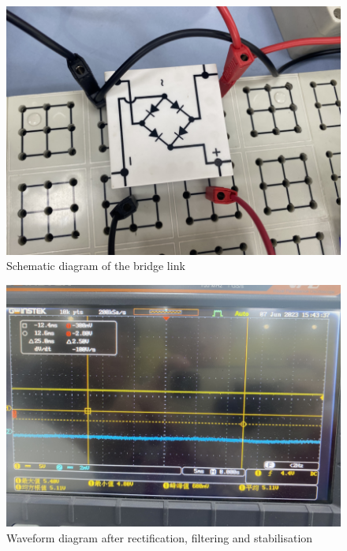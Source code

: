 \documentclass[UTF8]{article}
\begin{document}
\begin{appendix}
    	\begin{figure}[H]
    	    	\centering
    	    	\includegraphics[clip,scale=0.8,trim={0 0 0 0}]{fig/fig16.png}
    	        \caption{Schematic diagram of the bridge link}
    	        \label{figure.16}
        \end{figure}          

    	\begin{figure}[H]
    	    	\centering
    	    	\includegraphics[clip,scale=0.8,trim={0 0 0 0}]{fig/fig17.png}
    	        \caption{Waveform diagram after rectification, filtering and stabilisation}
    	        \label{figure.17}
        \end{figure}  
        

\end{appendix}
\end{document}
